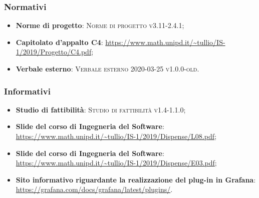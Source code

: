 \documentclass[../analisi-dei-requisiti.tex]{subfiles}
\begin{document}
\subsubsection{Normativi}%
\label{sssec:normativi}

\begin{itemize}
  \item \textbf{Norme di progetto}: \textsc{Norme di progetto v3.11-2.4.1};
  \item \textbf{Capitolato d'appalto C4}: \url{https://www.math.unipd.it/~tullio/IS-1/2019/Progetto/C4.pdf};
  \item \textbf{Verbale esterno}: \textsc{Verbale esterno 2020-03-25 v1.0.0-old}.
\end{itemize}

\subsubsection{Informativi}%
\label{sssec:informativi}

\begin{itemize}
  \item \textbf{Studio di fattibilità}: \textsc{Studio di fattibilità v1.4-1.1.0};
  \item \textbf{Slide del corso di Ingegneria del Software}: \url{https://www.math.unipd.it/~tullio/IS-1/2019/Dispense/L08.pdf};
  \item \textbf{Slide del corso di Ingegneria del Software}: \url{https://www.math.unipd.it/~tullio/IS-1/2019/Dispense/E03.pdf};
  \item \textbf{Sito informativo riguardante la realizzazione del plug-in in Grafana}: \url{https://grafana.com/docs/grafana/latest/plugins/}.
\end{itemize}
\end{document}
